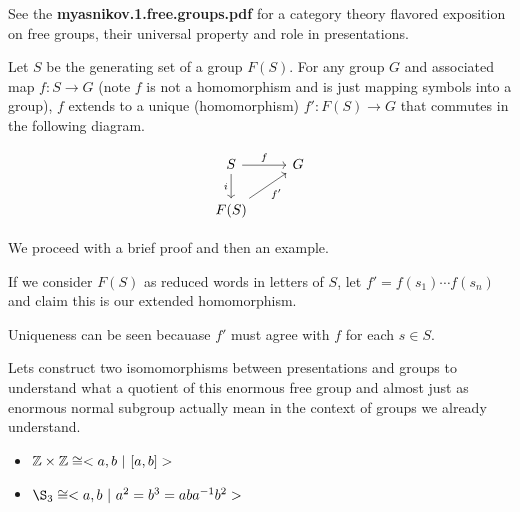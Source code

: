 \documentclass[10pt]{article}
\begin{document}
% 
% 

\begin{note}
	See the \textbf{myasnikov.1.free.groups.pdf} for a category theory flavored exposition on free
	groups, their universal property and role in presentations.
\end{note}

\begin{note}
Let $S$ be the generating set of a group $F(S)$. For any group $G$ and associated
map $f: S \to G$ (note $f$ is not a homomorphism and is just mapping symbols
into a group), $f$ extends to a unique (homomorphism) $f': F(S) \to G$ that commutes in the following diagram.

\[
\begin{tikzcd}
S \arrow[r, "f"] \arrow[d, "i"'] & G \\
F(S) \arrow[ru, "f'"']           &  
\end{tikzcd}
\]

We proceed with a brief proof and then an example.

If we consider $F(S)$ as reduced words in letters of $S$, let $f' =
f(s_1)\cdots f(s_n)$ and claim this is our extended homomorphism.

Uniqueness can be seen becauase $f'$ must agree with $f$ for each $s \in S$.

\end{note}

Lets construct two isomomorphisms between presentations and groups to understand
what a quotient of this enormous free group and almost just as enormous normal
subgroup actually mean in the context of groups we already understand.

\begin{itemize}
	\item{$\mathbb{Z} \times \mathbb{Z} \cong <a,b~|~[a,b]>$}
	\item{$\S_3 \cong <a,b~|~a^2=b^3=aba^{-1}b^2>$}
\end{itemize}
\end{document}
